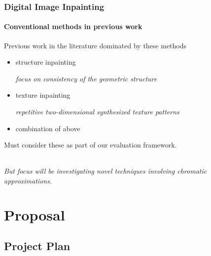 \documentclass{beamer}
\begin{document}
\begin{frame}
\frametitle{Digital Image Inpainting}
\framesubtitle{Conventional methods in previous work}

Previous work in the literature dominated by these methods

\begin{itemize}
	\item structure inpainting\cite{Bertalmio2000}

	\textit{focus on consistency of the geometric structure}

	\item texture inpainting

	\textit{repetitive two-dimensional synthesized texture patterns}

	\item combination of above\cite{Criminisi2004}
\end{itemize}
        
Must consider these as part of our evaluation framework. \\~

\textit{But focus will be investigating novel techniques involving 
chromatic approximations.}

\end{frame}


\section{Proposal}

\subsection{Project Plan}
\end{document}
